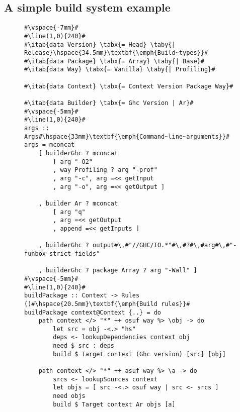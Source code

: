 \subsection{A simple build system example\label{sec:build-example}}

\newcommand{\tabx}[1]{\hspace{.106\textwidth}\rlap{#1}}
\newcommand{\taby}[1]{\hspace{.074\textwidth}\rlap{#1}}
\newcommand{\tabz}[1]{\hspace{.24\textwidth}\rlap{#1}}

\begin{figure}
\begin{lstlisting}
#\vspace{-7mm}#
#\line(1,0){240}#
#\itab{data Version} \tabx{= Head} \taby{| Release}\hspace{34.5mm}\textbf{\emph{Build~types}}#
#\itab{data Package} \tabx{= Array} \taby{| Base}#
#\itab{data Way} \tabx{= Vanilla} \taby{| Profiling}#

#\itab{data Context} \tabx{= Context Version Package Way}#

#\itab{data Builder} \tabx{= Ghc Version | Ar}#
#\vspace{-5mm}#
#\line(1,0){240}#
args :: Args#\hspace{33mm}\textbf{\emph{Command~line~arguments}}#
args = mconcat
    [ builderGhc ? mconcat
        [ arg "-O2"
        , way Profiling ? arg "-prof"
        , arg "-c", arg =<< getInput
        , arg "-o", arg =<< getOutput ]

    , builder Ar ? mconcat
        [ arg "q"
        , arg =<< getOutput
        , append =<< getInputs ]

    , builderGhc ? output#\,#"//GHC/IO.*"#\,#?#\,#arg#\,#"-funbox-strict-fields"

    , builderGhc ? package Array ? arg "-Wall" ]
#\vspace{-5mm}#
#\line(1,0){240}#
buildPackage :: Context -> Rules ()#\hspace{20.5mm}\textbf{\emph{Build rules}}#
buildPackage context@Context {..} = do
    path context </> "*" ++ osuf way %> \obj -> do
        let src = obj -<.> "hs"
        deps <- lookupDependencies context obj
        need $ src : deps
        build $ Target context (Ghc version) [src] [obj]

    path context </> "*" ++ asuf way %> \a -> do
        srcs <- lookupSources context
        let objs = [ src -<.> osuf way | src <- srcs ]
        need objs
        build $ Target context Ar objs [a]


\end{lstlisting}
\end{figure}

